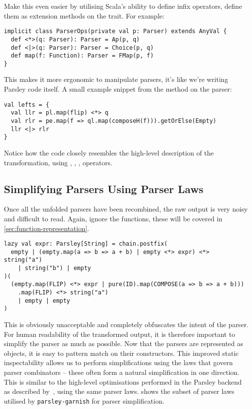 \documentclass[../../main.tex]{subfiles}
\begin{document}
Make this even easier by utilising Scala's ability to define infix operators, define them as extension methods on the  trait.
For example:
\begin{verbatim}
implicit class ParserOps(private val p: Parser) extends AnyVal {
  def <*>(q: Parser): Parser = Ap(p, q)
  def <|>(q: Parser): Parser = Choice(p, q)
  def map(f: Function): Parser = FMap(p, f)
}
\end{verbatim}
%
This makes it more ergonomic to manipulate parsers, it's like we're writing Parsley code itself.
A small example snippet from the  method on the  parser:
\begin{verbatim}
val lefts = {
  val llr = pl.map(flip) <*> q
  val rlr = pe.map(f => ql.map(composeH(f))).getOrElse(Empty)
  llr <|> rlr
}
\end{verbatim}
Notice how the code closely resembles the high-level description of the transformation, using \scala{<*>}, \scala{<|>}, , operators.

\subsection{Simplifying Parsers Using Parser Laws}\label{sec:simplify-parsers}
Once all the unfolded parsers have been recombined, the raw output is very noisy and difficult to read.
Again, ignore the functions, these will be covered in \cref{sec:function-representation}.
\begin{verbatim}
lazy val expr: Parsley[String] = chain.postfix(
  empty | (empty.map(a => b => a + b) | empty <*> expr) <*> string("a")
    | string("b") | empty
)(
  (empty.map(FLIP) <*> expr | pure(ID).map(COMPOSE(a => b => a + b)))
    .map(FLIP) <*> string("a")
    | empty | empty
)
\end{verbatim}
%
This is obviously unacceptable and completely obfuscates the intent of the parser.
For human readability of the transformed output, it is therefore important to simplify the parser as much as possible.
Now that the parsers are represented as objects, it is easy to pattern match on their constructors.
This improved static inspectability allows us to perform simplifications using the laws that govern parser combinators -- these often form a natural simplification in one direction.
This is similar to the high-level optimisations performed in the Parsley backend as described by~\textcite{willis_staged_2023}, using the same parser laws.
 shows the subset of parser laws utilised by \texttt{parsley-garnish} for parser simplification.
\end{document}
